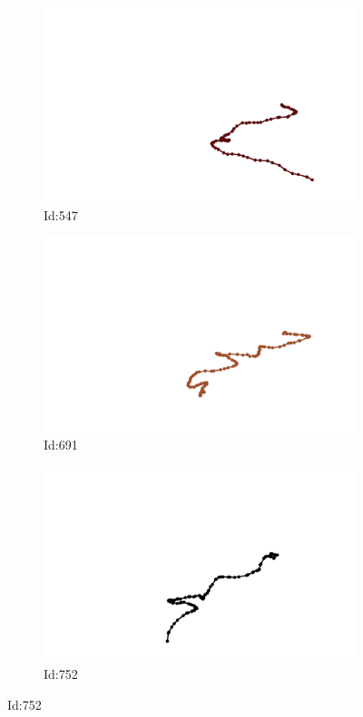 \documentclass[12pt,twoside]{report}
\begin{document}
\begin{figure}
\centering
\begin{subfigure}[b]{0.20\textwidth}
\centering
\includegraphics[width=\textwidth]{../../trajectories/547.png}
\caption{Id:547}
\end{subfigure}
\begin{subfigure}[b]{0.20\textwidth}
\centering
\includegraphics[width=\textwidth]{../../trajectories/691.png}
\caption{Id:691}
\end{subfigure}
\begin{subfigure}[b]{0.20\textwidth}
\centering
\includegraphics[width=\textwidth]{../../trajectories/752.png}
\caption{Id:752}
\end{subfigure}
\end{figure}
\end{document}
